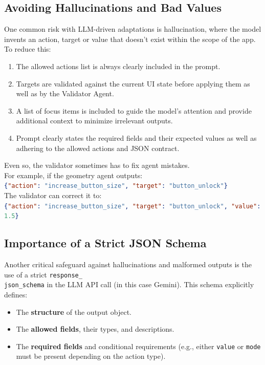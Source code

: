 \documentclass[openany]{book}
\begin{document}
\subsection{Avoiding Hallucinations and Bad Values}
One common risk with LLM-driven adaptations is hallucination, where the model invents an action, target or value that doesn’t exist within the scope of the app.
To reduce this:
\begin{enumerate}
    \item The allowed actions list is always clearly included in the prompt.
    \item Targets are validated against the current UI state before applying them as well as by the Validator Agent.
    \item A list of focus items is included to guide the model's attention and provide additional context to minimize irrelevant outputs.
    \item Prompt clearly states the required fields and their expected values as well as adhering to the allowed actions and JSON contract.
\end{enumerate}
Even so, the validator sometimes has to fix agent mistakes.\\
For example, if the geometry agent outputs: \\
\lstinline[language=json]|{"action": "increase_button_size", "target": "button_unlock"}|\\
The validator can correct it to:\\
\lstinline[language=json]|{"action": "increase_button_size", "target": "button_unlock", "value": 1.5}|

\subsection{Importance of a Strict JSON Schema}
Another critical safeguard against hallucinations and malformed outputs is the use of a strict \texttt{response\_\\json\_schema} in the LLM API call (in this case Gemini). This schema explicitly defines:
\begin{itemize}
    \item The \textbf{structure} of the output object.
    \item The \textbf{allowed fields}, their types, and descriptions.
    \item The \textbf{required fields} and conditional requirements (e.g., either \texttt{value} or \texttt{mode} must be present depending on the action type).
\end{itemize}
\end{document}
